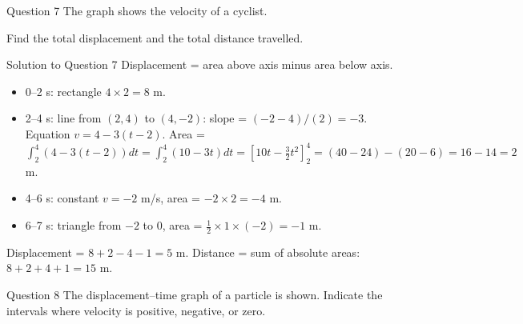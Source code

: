 \documentclass{beamer}
\begin{document}
\begin{frame}[shrink=15]{Question 7}
The graph shows the velocity of a cyclist.
\begin{center}
\end{center}
Find the total displacement and the total distance travelled.
\end{frame}

\begin{frame}[shrink=15]{Solution to Question 7}
Displacement = area above axis minus area below axis.
\begin{itemize}
    \item 0–2 s: rectangle $4\times2 = 8$ m.
    \item 2–4 s: line from $(2,4)$ to $(4,-2)$: slope = $(-2-4)/(2) = -3$. Equation $v = 4 -3(t-2)$. Area = $\int_2^4 (4 -3(t-2)) dt = \int_2^4 (10 -3t) dt = [10t - \frac{3}{2}t^2]_2^4 = (40 - 24) - (20 -6) = 16 -14 = 2$ m.
    \item 4–6 s: constant $v=-2$ m/s, area = $-2\times2 = -4$ m.
    \item 6–7 s: triangle from $-2$ to $0$, area = $\frac12 \times 1 \times (-2) = -1$ m.
\end{itemize}
Displacement = $8 + 2 -4 -1 = 5$ m.
Distance = sum of absolute areas: $8 + 2 + 4 + 1 = 15$ m.
\end{frame}

\begin{frame}[shrink=15]{Question 8}
The displacement–time graph of a particle is shown. Indicate the intervals where velocity is positive, negative, or zero.
\begin{center}
\end{center}
\end{frame}
\end{document}
